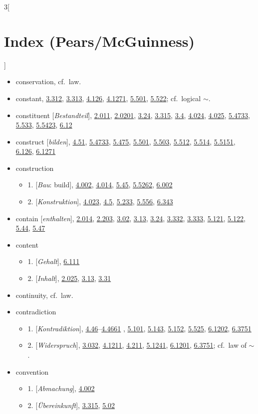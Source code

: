 \documentclass[oneside,openany,12pt]{book}
\newcommand{\indexentry}[1]{\item #1}
\newcommand{\indexsubentry}[1]{\begin{itemize} \item #1 \end{itemize}}
\newcommand{\indexref}[1]{\hyperlink{prop#1}{#1}}
\begin{document}
\begin{multicols}{3}[\section*{Index (Pears/McGuinness)}]
\begin{itemize}
\indexentry{conservation, cf.\ law.}

\indexentry{constant, \indexref{3.312}, \indexref{3.313}, \indexref{4.126}, \indexref{4.1271}, \indexref{5.501}, \indexref{5.522}; cf.\ logical $\sim$.}

\indexentry{constituent [\textit{Bestandteil}], \indexref{2.011}, \indexref{2.0201}, \indexref{3.24}, \indexref{3.315}, \indexref{3.4}, \indexref{4.024}, \indexref{4.025}, \indexref{5.4733}, \indexref{5.533}, \indexref{5.5423}, \indexref{6.12}}

\indexentry{construct [\textit{bilden}], \indexref{4.51}, \indexref{5.4733}, \indexref{5.475}, \indexref{5.501}, \indexref{5.503}, \indexref{5.512}, \indexref{5.514}, \indexref{5.5151}, \indexref{6.126}, \indexref{6.1271}}

\indexentry{construction}

   \indexsubentry{1. [\textit{Bau}: build], \indexref{4.002}, \indexref{4.014}, \indexref{5.45}, \indexref{5.5262}, \indexref{6.002}}

   \indexsubentry{2. [\textit{Konstruktion}], \indexref{4.023}, \indexref{4.5}, \indexref{5.233}, \indexref{5.556}, \indexref{6.343}}

\indexentry{contain [\textit{enthalten}], \indexref{2.014}, \indexref{2.203}, \indexref{3.02}, \indexref{3.13}, \indexref{3.24}, \indexref{3.332}, \indexref{3.333}, \indexref{5.121}, \indexref{5.122}, \indexref{5.44}, \indexref{5.47}}

\indexentry{content}

   \indexsubentry{1. [\textit{Gehalt}], \indexref{6.111}}

   \indexsubentry{2. [\textit{Inhalt}], \indexref{2.025}, \indexref{3.13}, \indexref{3.31}}

\indexentry{continuity, cf.\ law.}

\indexentry{contradiction}

   \indexsubentry{1. [\textit{Kontradiktion}], \indexref{4.46}--\indexref{4.4661} , \indexref{5.101}, \indexref{5.143}, \indexref{5.152}, \indexref{5.525}, \indexref{6.1202}, \indexref{6.3751}}

   \indexsubentry{2. [\textit{Widerspruch}], \indexref{3.032}, \indexref{4.1211}, \indexref{4.211}, \indexref{5.1241}, \indexref{6.1201}, \indexref{6.3751}; cf.\ law of $\sim$.}

\indexentry{convention}

   \indexsubentry{1. [\textit{Abmachung}], \indexref{4.002}}

   \indexsubentry{2. [\textit{{\"U}bereinkunft}], \indexref{3.315}, \indexref{5.02}}


\end{itemize}
\end{multicols}
\end{document}
